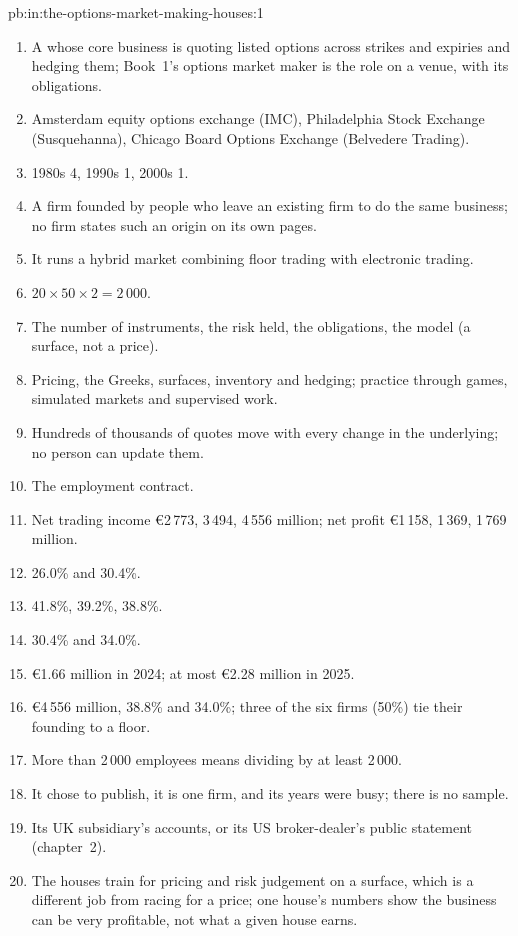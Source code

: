 \begin{solution}{pb:in:the-options-market-making-houses:1}
\begin{enumerate}
\item A  whose core business is quoting listed options across strikes and expiries and hedging
them; Book~1's options market maker is the role on a venue, with its obligations.
\item Amsterdam equity options exchange (IMC), Philadelphia Stock Exchange (Susquehanna), Chicago Board Options Exchange
(Belvedere Trading).
\item 1980s 4, 1990s 1, 2000s 1.
\item A firm founded by people who leave an existing firm to do the same business; no firm states such an origin on
its own pages.
\item It runs a hybrid market combining  floor trading with electronic trading.
\item $20\times50\times2=2\,000$.
\item The number of instruments, the risk held, the obligations, the model (a surface, not a price).
\item Pricing, the Greeks, surfaces, inventory and hedging; practice through games, simulated markets and supervised
work.
\item Hundreds of thousands of quotes move with every change in the underlying; no person can update them.
\item The employment contract.
\item Net trading income \euro2\,773, 3\,494, 4\,556 million; net profit \euro1\,158, 1\,369, 1\,769 million.
\item 26.0\% and 30.4\%.
\item 41.8\%, 39.2\%, 38.8\%.
\item 30.4\% and 34.0\%.
\item \euro1.66 million in 2024; at most \euro2.28 million in 2025.
\item \euro4\,556 million, 38.8\% and 34.0\%; three of the six firms (50\%) tie their founding to a floor.
\item More than 2\,000 employees means dividing by at least 2\,000.
\item It chose to publish, it is one firm, and its years were busy; there is no sample.
\item Its UK subsidiary's accounts, or its US broker-dealer's public statement (chapter~2).
\item The houses train for pricing and risk judgement on a surface, which is a different job from racing for a
price; one house's numbers show the business can be very profitable, not what a given house earns.
\end{enumerate}
\end{solution}

